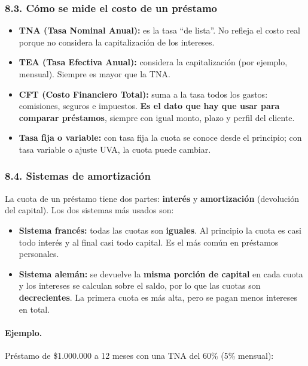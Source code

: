 \subsubsection*{8.3. Cómo se mide el costo de un préstamo}
\begin{itemize}
  \item \textbf{TNA (Tasa Nominal Anual):} es la tasa ``de lista''. No refleja el costo real
        porque no considera la capitalización de los intereses.
  \item \textbf{TEA (Tasa Efectiva Anual):} considera la capitalización (por ejemplo, mensual).
        Siempre es mayor que la TNA.
  \item \textbf{CFT (Costo Financiero Total):} suma a la tasa todos los gastos: comisiones,
        seguros e impuestos. \textbf{Es el dato que hay que usar para comparar préstamos},
        siempre con igual monto, plazo y perfil del cliente.
  \item \textbf{Tasa fija o variable:} con tasa fija la cuota se conoce desde el principio;
        con tasa variable o ajuste UVA, la cuota puede cambiar.
\end{itemize}

\subsubsection*{8.4. Sistemas de amortización}
La cuota de un préstamo tiene dos partes: \textbf{interés} y \textbf{amortización}
(devolución del capital). Los dos sistemas más usados son:
\begin{itemize}
  \item \textbf{Sistema francés:} todas las cuotas son \textbf{iguales}. Al principio la cuota
        es casi todo interés y al final casi todo capital. Es el más común en préstamos
        personales.
  \item \textbf{Sistema alemán:} se devuelve la \textbf{misma porción de capital} en cada
        cuota y los intereses se calculan sobre el saldo, por lo que las cuotas son
        \textbf{decrecientes}. La primera cuota es más alta, pero se pagan menos intereses
        en total.
\end{itemize}

\paragraph*{Ejemplo.}
Préstamo de \$1.000.000 a 12 meses con una TNA del 60\% (5\% mensual):


